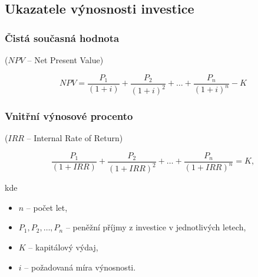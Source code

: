 \subsection{Ukazatele výnosnosti investice}



\subsubsection*{Čistá současná hodnota}

($NPV$ -- Net Present Value)

$$ NPV = \frac{P_1}{(1+i)} + \frac{P_2}{(1+i)^2} + \ldots + \frac{P_n}{(1+i)^n} - K $$

\subsubsection*{Vnitřní výnosové procento}

($IRR$ -- Internal Rate of Return)


$$ \frac{P_1}{(1+IRR)} + \frac{P_2}{(1+IRR)^2} + \ldots + \frac{P_n}{(1+IRR)^n} = K , $$

kde
\begin{itemize}[label={}]
    \item $n$ -- počet let,
    \item $P_1, P_2, \ldots, P_n$ -- peněžní příjmy z investice v jednotlivých letech,
    \item $K$ -- kapitálový výdaj,
    \item $i$ -- požadovaná míra výnosnosti.
\end{itemize}
